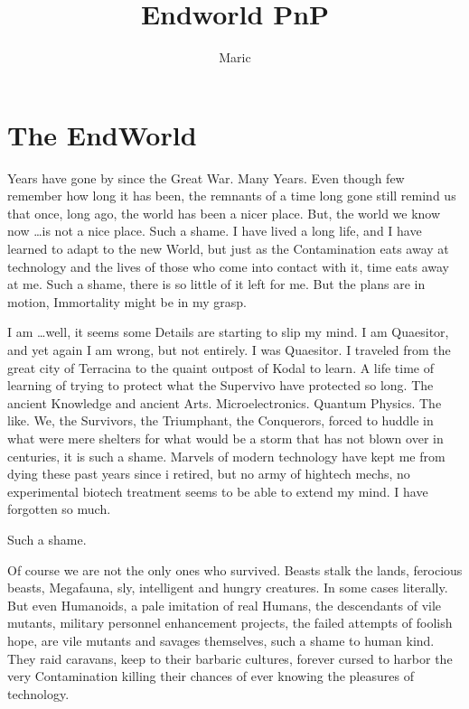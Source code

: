 \documentclass{book}
\title{Endworld PnP}
\author{Maric}
\date{}
\begin{document}
    \maketitle
    \tableofcontents
    \section{The EndWorld}\label{sec:theEndworld}

    Years have gone by since the Great War.
    Many Years.
    Even though few remember how long it has been, the remnants of a time long gone still remind us that once,
    long ago, the world has been a nicer place.
    But, the world we know now \ldots is not a nice place.
    Such a shame.
    I have lived a long life, and I have learned to adapt to the new World,
    but just as the Contamination eats away at technology and the lives of those who come into contact with it, time
    eats away at me.
    Such a shame, there is so little of it left for me.
    But the plans are in motion, Immortality might be in my grasp.\par
    I am \ldots well, it seems some Details are starting to slip my mind.
    I am Quaesitor, and yet again I am wrong, but not entirely.
    I was Quaesitor.
    I traveled from the great city of Terracina to the quaint outpost of Kodal to learn.
    A life time of learning of trying to protect what the Supervivo have protected so long.
    The ancient Knowledge and ancient Arts.
    Microelectronics.
    Quantum Physics.
    The like.
    We, the Survivors, the Triumphant, the Conquerors,
    forced to huddle in what were mere shelters for what would be a storm that has not blown over in centuries,
    it is such a shame.
    Marvels of modern technology have kept me from dying these past years since i retired,
    but no army of hightech mechs, no experimental biotech treatment seems to be able to extend my mind.
    I have forgotten so much.
    \par Such a shame.\par
    Of course we are not the only ones who survived.
    Beasts stalk the lands, ferocious beasts, Megafauna, sly, intelligent and hungry creatures.
    In some cases literally.
    But even Humanoids, a pale imitation of real Humans, the descendants of vile mutants,
    military personnel enhancement projects, the failed attempts of foolish hope,
    are vile mutants and savages themselves, such a shame to human kind.
    They raid caravans, keep to their barbaric cultures,
    forever cursed to harbor the very Contamination killing their chances of ever knowing the pleasures of technology.
\end{document}
